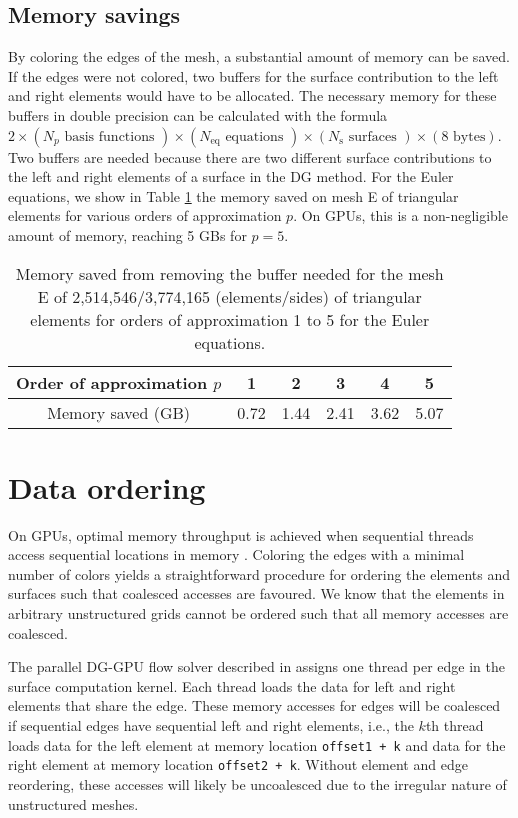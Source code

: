 \documentclass[12pt]{article}
\begin{document}
\subsection{Memory savings} \label{sec:memorysaved}
	By coloring the edges of the mesh, a substantial amount of memory can be saved.  If the edges were not colored, two buffers for the surface contribution to the left and right elements would have to be allocated.  The necessary memory for these buffers in double precision can be calculated with the formula $2  \times( N_p \text{ basis functions } )\times (N_{\text{eq}} \text{ equations })\times (N_{\text{s}} \text{ surfaces }) \times (8 \text{ bytes})$.  Two buffers are needed because there are two different surface contributions to the left and right elements of a surface in the DG method.  For the Euler equations, we show in Table \ref{tab:memory} the memory saved on mesh E of triangular elements for various orders of approximation $p$.  On GPUs, this is a non-negligible amount of memory, reaching 5 GBs for $p=5$.
	
		\begin{table}
		\centering

		\begin{tabular}{|c|c|c|c|c|c|}
				\hline Order of approximation $p$ & 1 & 2 & 3 & 4 & 5 \\ 
				\hline Memory saved (GB) & 0.72 & 1.44 & 2.41 & 3.62 & 5.07  \\
				\hline
		\end{tabular} 
		\caption{Memory saved from removing the buffer needed for the mesh E of 2,514,546/3,774,165 (elements/sides) of triangular elements for orders of approximation 1 to 5 for the Euler equations.} \label{tab:memory}
		\end{table}



\section{Data ordering}

On GPUs, optimal memory throughput is achieved when sequential threads access sequential locations in memory \cite{programmingguide}.  Coloring the edges with a minimal number of colors yields a straightforward procedure for ordering the elements and surfaces such that coalesced accesses are favoured.  We know that the elements in arbitrary unstructured grids cannot be ordered such that all memory accesses are coalesced.


The parallel DG-GPU flow solver described in \cite{giuliani} assigns one thread per edge in the surface computation kernel.  Each thread loads the data for left and right elements that share the edge.  These memory accesses for edges will be coalesced if sequential edges have sequential left and right elements, i.e., the $k$th thread loads data for the left element at memory location \texttt{offset1 + k} and data for the right element at memory location \texttt{offset2 + k}.  Without element and edge reordering, these accesses will likely be uncoalesced due to the irregular nature of unstructured meshes.
\end{document}
